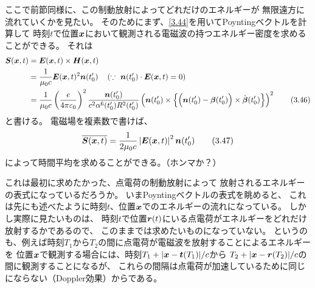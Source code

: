 \documentclass[a4paper, 10pt]{jsarticle}
\theoremstyle{definition}
\def\vec#1{\mbox{\boldmath $#1$}}
\begin{document}
ここで前節同様に、この制動放射によってどれだけのエネルギーが
無限遠方に流れていくかを見たい。
そのためにまず、\eqref{3.44}を用いてPoyntingベクトルを計算して
時刻$t$で位置$\vec{x}$において観測される電磁波の持つエネルギー密度を求めることができる。
それは
\begin{align}
	\vec{S}(\vec{x}, t) &= \vec{E}(\vec{x}, t) \times \vec{H}(\vec{x}, t) \\
	&= \frac{1}{\mu_0 c} \vec{E}(\vec{x}, t)^2 \vec{n}(t_0')
	\quad \left( \because \ \vec{n}(t_0') \cdot \vec{E}(\vec{x}, t) = 0 \right) \\
	&= \frac{1}{\mu_0 c} \left( \frac{e}{4\pi \varepsilon_0} \right)^2
	\frac{\vec{n}(t_0')}{c^2 \alpha^6(t_0') R^2(t_0')} \left(
		\vec{n}(t_0') \times \left\{
			\Bigl( \vec{n}(t_0') - \vec{\beta}(t_0') \Bigr)
			\times \dot{\vec{\beta}}(t_0')
		\right\}
	\right)^2
	\tag{3.46} \label{3.46}
\end{align}
と書ける。
電磁場を複素数で書けば、
\begin{align}
	\overline{\vec{S}(\vec{x}, t)} = \frac{1}{2\mu_0 c}
	\left| \vec{E}(\vec{x}, t) \right|^2 \vec{n}(t_0')
	\tag{3.47} \label{3.47}
\end{align}
によって時間平均を求めることができる。（ホンマか？）

これは最初に求めたかった、点電荷の制動放射によって
放射されるエネルギーの表式になっているだろうか。
いまPoyntingベクトルの表式を眺めると、
これは先にも述べたように時刻$t$、位置$\vec{x}$でのエネルギーの流れになっている。
しかし実際に見たいものは、
時刻$t$で位置$\vec{r}(t)$にいる点電荷がエネルギーをどれだけ放射するかであるので、
このままでは求めたいものになっていない。
というのも、例えば時刻$T_1$から$T_2$の間に点電荷が電磁波を放射することによるエネルギーを
位置$\vec{x}$で観測する場合には、時刻$T_1 + |\vec{x} - \vec{t}(T_1)|/c$から
$T_2 + |\vec{x} - \vec{r}(T_2)|/c$の間に観測することになるが、
これらの間隔は点電荷が加速しているために同じにならない（Doppler効果）からである。
\end{document}
